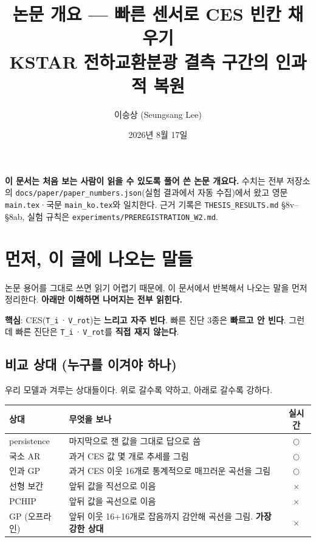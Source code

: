 \documentclass[10pt]{article}
\title{\textbf{논문 개요 — 빠른 센서로 CES 빈칸 채우기}\\[4pt]
       \large KSTAR 전하교환분광 결측 구간의 인과적 복원}
\author{이승상 (Seungsang Lee)}
\date{2026년 8월 17일}
\newcommand{\Ti}{\texttt{T\_i}}
\newcommand{\Vrot}{\texttt{V\_rot}}
\newcommand{\yes}{\ensuremath{\bigcirc}}
\newcommand{\no}{\ensuremath{\times}}
\newenvironment{note}{\begin{snugshade}\small}{\end{snugshade}}
\begin{document}
\maketitle

\begin{note}
\textbf{이 문서는 처음 보는 사람이 읽을 수 있도록 풀어 쓴 논문 개요다.}
수치는 전부 저장소의 \texttt{docs/paper/paper\_numbers.json}(실험 결과에서 자동 수집)에서
왔고 영문 \texttt{main.tex}·국문 \texttt{main\_ko.tex}와 일치한다.
근거 기록은 \texttt{THESIS\_RESULTS.md} §8v--§8ab, 실험 규칙은
\texttt{experiments/PREREGISTRATION\_W2.md}.
\end{note}

\tableofcontents
\vspace{6pt}

\section{먼저, 이 글에 나오는 말들}

논문 용어를 그대로 쓰면 읽기 어렵기 때문에, 이 문서에서 반복해서 나오는 말을 먼저
정리한다. \textbf{아래만 이해하면 나머지는 전부 읽힌다.}

\textbf{핵심}: CES(\Ti\,·\,\Vrot)는 \textbf{느리고 자주 빈다}. 빠른 진단 3종은
\textbf{빠르고 안 빈다}. 그런데 빠른 진단은 \Ti\,·\,\Vrot 를 \textbf{직접 재지 않는다}.

\subsection{비교 상대 (누구를 이겨야 하나)}

우리 모델과 겨루는 상대들이다. 위로 갈수록 약하고, 아래로 갈수록 강하다.

\begin{center}
\begin{tabularx}{\textwidth}{@{}l L c@{}}
\toprule
\textbf{상대} & \textbf{무엇을 보나} & \textbf{실시간} \\
\midrule
persistence & 마지막으로 잰 값을 그대로 답으로 씀 & \yes \\
국소 AR & 과거 CES 값 몇 개로 추세를 그림 & \yes \\
인과 GP & 과거 CES 이웃 16개로 통계적으로 매끄러운 곡선을 그림 & \yes \\
선형 보간 & 앞뒤 값을 직선으로 이음 & \no \\
PCHIP & 앞뒤 값을 곡선으로 이음 & \no \\
GP (오프라인) & 앞뒤 이웃 16+16개로 잡음까지 감안해 곡선을 그림. \textbf{가장 강한 상대} & \no \\
\bottomrule
\end{tabularx}
\end{center}
\end{document}
